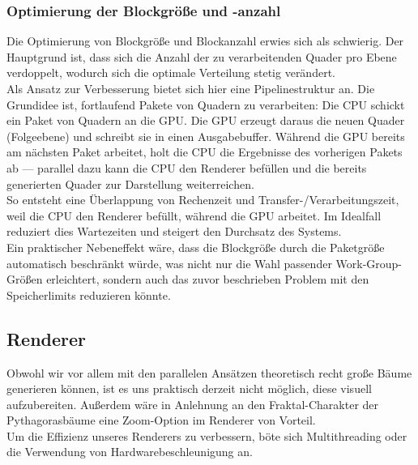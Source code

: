\subsubsection*{Optimierung der Blockgröße und -anzahl}
\vspace{-0.25cm}
Die Optimierung von Blockgröße und Blockanzahl erwies sich als schwierig. Der Hauptgrund ist, dass sich die Anzahl der zu verarbeitenden
Quader pro Ebene verdoppelt, wodurch sich die optimale Verteilung stetig verändert.\\
Als Ansatz zur Verbesserung bietet sich hier eine Pipelinestruktur an. Die Grundidee ist, fortlaufend Pakete von Quadern zu verarbeiten:
Die CPU schickt ein Paket von Quadern an die GPU.
Die GPU erzeugt daraus die neuen Quader (Folgeebene) und schreibt sie in einen Ausgabebuffer.
Während die GPU bereits am nächsten Paket arbeitet, holt die CPU die Ergebnisse des vorherigen Pakets ab --- parallel dazu kann die CPU den Renderer 
befüllen und die bereits generierten Quader zur Darstellung weiterreichen.\\
So entsteht eine Überlappung von Rechenzeit und Transfer-/Verarbeitungszeit, weil die CPU den Renderer befüllt, während die GPU arbeitet.
Im Idealfall reduziert dies Wartezeiten und steigert den Durchsatz des Systems. \\
Ein praktischer Nebeneffekt wäre, dass die Blockgröße durch die Paketgröße automatisch beschränkt würde, was nicht nur die Wahl passender Work-Group-Größen
erleichtert, sondern auch das zuvor beschrieben Problem mit den Speicherlimits reduzieren könnte.

\newpage
\subsection*{Renderer}
Obwohl wir vor allem mit den parallelen Ansätzen theoretisch recht große Bäume generieren können, ist es uns praktisch derzeit nicht möglich, diese
visuell aufzubereiten. Außerdem wäre in Anlehnung an den Fraktal-Charakter der Pythagorasbäume eine Zoom-Option im Renderer von Vorteil.\\
Um die Effizienz unseres Renderers zu verbessern, böte sich Multithreading oder die Verwendung von Hardwarebeschleunigung an. 
